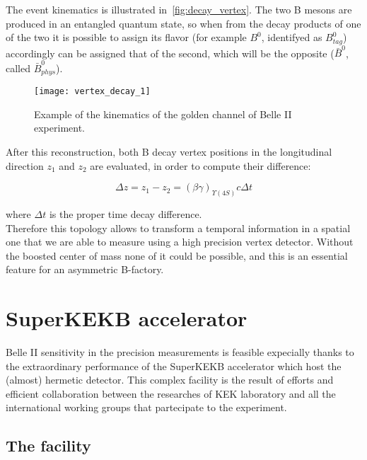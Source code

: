 The event kinematics is illustrated in~\autoref{fig:decay_vertex}. The two B mesons are produced in an entangled quantum state, so when from the decay products of one of the two it is possible to assign its flavor (for example $B^{0}$, identifyed as $B_{tag}^{0}$) accordingly can be assigned that of the second, which will be the opposite ($\bar{B}^{0}$, called $\bar{B}_{phys}^{0}$).

\begin{figure}[h!]
\centering
\texttt{[image: vertex\_decay\_1]}
\caption{Example of the kinematics of the golden channel of Belle II experiment.}
\label{fig:decay_vertex}
\end{figure}

After this reconstruction, both B decay vertex positions in the longitudinal direction $\textit{z}_{1}$ and $\textit{z}_{2}$ are evaluated, in order to compute their difference:

\begin{equation}
\Delta \textit{z} = \textit{z}_{1} - \textit{z}_{2} = (\beta\gamma)_{\Upsilon(4S)}c\Delta t
\end{equation}

where $\Delta t$ is the proper time decay difference. \\
Therefore this topology allows to transform a temporal information in a spatial one that we are able to measure using a high precision vertex detector. Without the boosted center of mass none of it could be possible, and this is an essential feature for an asymmetric B-factory. 


\section{SuperKEKB accelerator}

Belle II sensitivity in the precision measurements is feasible expecially thanks to the extraordinary performance of the SuperKEKB accelerator which host the (almost) hermetic detector. This complex facility is the result of efforts and efficient collaboration between the researches of KEK laboratory and all the international working groups that partecipate to the experiment.


\subsection{The facility}

